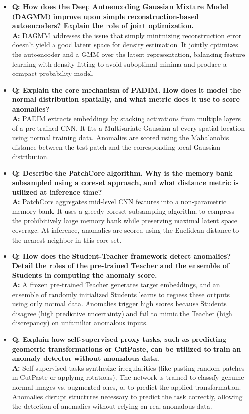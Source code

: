 \begin{itemize}
    \item \textbf{Q: How does the Deep Autoencoding Gaussian Mixture Model (DAGMM) improve upon simple reconstruction-based autoencoders? Explain the role of joint optimization.} \\
    \textbf{A:} DAGMM addresses the issue that simply minimizing reconstruction error doesn't yield a good latent space for density estimation. It jointly optimizes the autoencoder and a GMM over the latent representation, balancing feature learning with density fitting to avoid suboptimal minima and produce a compact probability model.
    
    \item \textbf{Q: Explain the core mechanism of PADIM. How does it model the normal distribution spatially, and what metric does it use to score anomalies?} \\
    \textbf{A:} PADIM extracts embeddings by stacking activations from multiple layers of a pre-trained CNN. It fits a Multivariate Gaussian at every spatial location using normal training data. Anomalies are scored using the Mahalanobis distance between the test patch and the corresponding local Gaussian distribution.
    
    \item \textbf{Q: Describe the PatchCore algorithm. Why is the memory bank subsampled using a coreset approach, and what distance metric is utilized at inference time?} \\
    \textbf{A:} PatchCore aggregates mid-level CNN features into a non-parametric memory bank. It uses a greedy coreset subsampling algorithm to compress the prohibitively large memory bank while preserving maximal latent space coverage. At inference, anomalies are scored using the Euclidean distance to the nearest neighbor in this core-set.
    
    \item \textbf{Q: How does the Student-Teacher framework detect anomalies? Detail the roles of the pre-trained Teacher and the ensemble of Students in computing the anomaly score.} \\
    \textbf{A:} A frozen pre-trained Teacher generates target embeddings, and an ensemble of randomly initialized Students learns to regress these outputs using only normal data. Anomalies trigger high scores because Students disagree (high predictive uncertainty) and fail to mimic the Teacher (high discrepancy) on unfamiliar anomalous inputs.
    
    \item \textbf{Q: Explain how self-supervised proxy tasks, such as predicting geometric transformations or CutPaste, can be utilized to train an anomaly detector without anomalous data.} \\
    \textbf{A:} Self-supervised tasks synthesize irregularities (like pasting random patches in CutPaste or applying rotations). The network is trained to classify genuine normal images vs. augmented ones, or to predict the applied transformation. Anomalies disrupt structures necessary to predict the task correctly, allowing the detection of anomalies without relying on real anomalous data.
    

\end{itemize}
